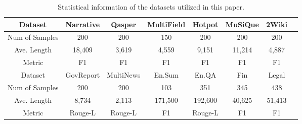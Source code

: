 \documentclass[sigconf]{acmart}
\begin{document}
\begin{table}[h]
\caption{Statistical information of the datasets utilized in this paper.}
\small
    \centering
    \begin{tabular}{cccccccc}
    \toprule
         Dataset   & Narrative & Qasper & MultiField & Hotpot & MuSiQue & 2Wiki \\
    \midrule
         Num of Samples & 200 & 200 & 150 & 200 & 200 & 200 \\
         Ave. Length &  18,409 & 3,619 & 4,559 & 9,151 & 11,214 & 4,887  \\
         Metric & F1 & F1 & F1 & F1 & F1 & F1\\
\midrule
\midrule
Dataset   & GovReport & MultiNews & En.Sum & En.QA & Fin & Legal \\
\midrule
Num of Samples& 200 & 200 & 103 & 351 & 345 & 438 \\
Ave. Length & 8,734& 2,113 & 171,500 & 192,600 & 40,625 & 51,413\\
Metric & Rouge-L & Rouge-L  & F1 & Rouge-L & F1 & F1 \\
    \bottomrule
    \end{tabular}
    
    \label{tab:data}
\end{table}
\end{document}
